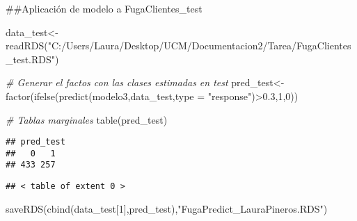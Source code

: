 \documentclass[
]{article}
\newenvironment{Shaded}{\begin{snugshade}}{\end{snugshade}}
\newcommand{\AttributeTok}[1]{\textcolor[rgb]{0.77,0.63,0.00}{#1}}
\newcommand{\CommentTok}[1]{\textcolor[rgb]{0.56,0.35,0.01}{\textit{#1}}}
\newcommand{\DecValTok}[1]{\textcolor[rgb]{0.00,0.00,0.81}{#1}}
\newcommand{\FloatTok}[1]{\textcolor[rgb]{0.00,0.00,0.81}{#1}}
\newcommand{\FunctionTok}[1]{\textcolor[rgb]{0.00,0.00,0.00}{#1}}
\newcommand{\NormalTok}[1]{#1}
\newcommand{\OtherTok}[1]{\textcolor[rgb]{0.56,0.35,0.01}{#1}}
\newcommand{\SpecialCharTok}[1]{\textcolor[rgb]{0.00,0.00,0.00}{#1}}
\newcommand{\StringTok}[1]{\textcolor[rgb]{0.31,0.60,0.02}{#1}}
\begin{document}
\#\#Aplicación de modelo a FugaClientes\_test

\begin{Shaded}
\begin{Highlighting}[]
\NormalTok{data\_test}\OtherTok{\textless{}{-}}\FunctionTok{readRDS}\NormalTok{(}\StringTok{"C:/Users/Laura/Desktop/UCM/Documentacion2/Tarea/FugaClientes\_test.RDS"}\NormalTok{)}
\end{Highlighting}
\end{Shaded}

\begin{Shaded}
\begin{Highlighting}[]
\CommentTok{\# Generar el factos con las clases estimadas en test}
\NormalTok{pred\_test}\OtherTok{\textless{}{-}}\FunctionTok{factor}\NormalTok{(}\FunctionTok{ifelse}\NormalTok{(}\FunctionTok{predict}\NormalTok{(modelo3,data\_test,}\AttributeTok{type =} \StringTok{"response"}\NormalTok{)}\SpecialCharTok{\textgreater{}}\FloatTok{0.3}\NormalTok{,}\DecValTok{1}\NormalTok{,}\DecValTok{0}\NormalTok{))}

\CommentTok{\# Tablas marginales}
\FunctionTok{table}\NormalTok{(pred\_test)}
\end{Highlighting}
\end{Shaded}

\begin{verbatim}
## pred_test
##   0   1 
## 433 257
\end{verbatim}

\begin{Shaded}
\end{Shaded}

\begin{verbatim}
## < table of extent 0 >
\end{verbatim}

\begin{Shaded}
\begin{Highlighting}[]
\FunctionTok{saveRDS}\NormalTok{(}\FunctionTok{cbind}\NormalTok{(data\_test[}\DecValTok{1}\NormalTok{],pred\_test),}\StringTok{"FugaPredict\_LauraPineros.RDS"}\NormalTok{)}
\end{Highlighting}
\end{Shaded}
\end{document}
